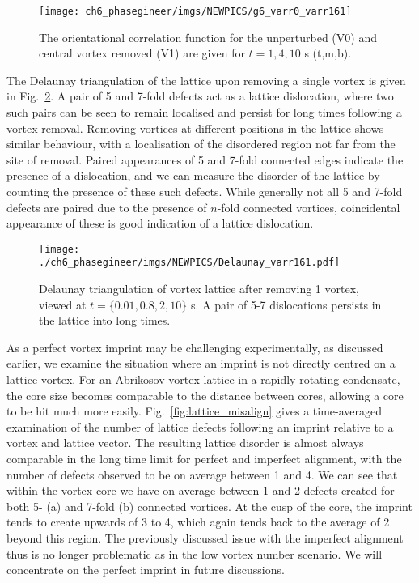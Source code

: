 \begin{figure} \centering
    \texttt{[image: ch6\_phasegineer/imgs/NEWPICS/g6\_varr0\_varr161]}
    \caption{The orientational correlation function for the unperturbed (V0) and central vortex removed (V1) are given for $t={1,4,10}$ s (t,m,b).}\label{fig:g6}
\end{figure}

The Delaunay triangulation of the lattice upon removing a single vortex is given in Fig.~\ref{fig:deltri_1vtx}. A pair of 5 and 7-fold defects act as a lattice dislocation, where two such pairs can be seen to remain localised and persist for long times following a vortex removal. Removing vortices at different positions in the lattice shows similar behaviour, with a localisation of the disordered region not far from the site of removal. Paired appearances of 5 and 7-fold connected edges indicate the presence of a dislocation, and we can measure the disorder of the lattice by counting the presence of these such defects. While generally not all 5 and 7-fold defects are paired due to the presence of $n$-fold connected vortices, coincidental appearance of these is good indication of a lattice dislocation.

\begin{figure} \centering
    \texttt{[image: ./ch6\_phasegineer/imgs/NEWPICS/Delaunay\_varr161.pdf]}
    \caption{Delaunay triangulation of vortex lattice after removing 1 vortex, viewed at $t=\{0.01,0.8,2,10\}$ s. A pair of 5-7 dislocations persists in the lattice into long times.}\label{fig:deltri_1vtx}
\end{figure}

As a perfect vortex imprint may be challenging experimentally, as discussed earlier, we examine the situation where an imprint is not directly centred on a lattice vortex. For an Abrikosov vortex lattice in a rapidly rotating condensate, the core size becomes comparable to the distance between cores, allowing a core to be hit much more easily. Fig.~\ref{fig:lattice_misalign} gives a time-averaged examination of the number of lattice defects following an imprint relative to a vortex and lattice vector. The resulting lattice disorder is almost always comparable in the long time limit for perfect and imperfect alignment, with the number of defects observed to be on average between 1 and 4.  We can see that within the vortex core we have on average between 1 and 2 defects created for both 5- (a) and 7-fold (b) connected vortices. At the cusp of the core, the imprint tends to create upwards of 3 to 4, which again tends back to the average of 2 beyond this region. The previously discussed issue with the imperfect alignment thus is no longer problematic as in the low vortex number scenario. We will concentrate on the perfect imprint in future discussions.

